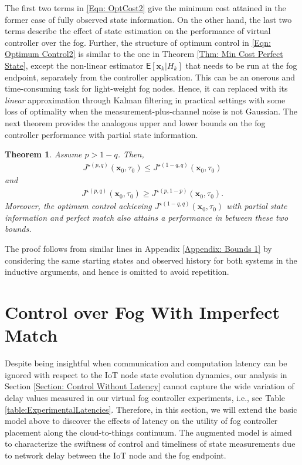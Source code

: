\documentclass[10pt, journal, letterpaper]{IEEEtran}
\newcommand{\paren}[1]{\left(#1\right)}
\newcommand{\1}{\ensuremath{\mathbf{1}}} %
\newcommand{\ES}[1]{\ensuremath{\mathsf{E}\left[#1 \right]}} %
\newcommand{\mincost}[2]{\ensuremath{J^{\star\paren{#1, #2}}}\paren{\vec{x}_0, \tau_0}}
\renewcommand{\vec}[1]{\ensuremath{\boldsymbol{#1}}} %
\newtheorem{theorem}{Theorem}
\begin{document}
The first two terms in \eqref{Eqn: OptCost2} give the minimum cost attained in the former case of fully observed state information. On the other hand, the last two terms describe the effect of state estimation on the performance of virtual controller over the fog. Further, the structure of optimum control in \eqref{Eqn: Optimum Control2} is similar to the one in Theorem \ref{Thm: Min Cost Perfect State}, except the non-linear estimator $\ES{\vec{x}_k \big| H_k}$ that needs to be run at the fog endpoint, separately from the controller application. This can be an onerous and time-consuming task for light-weight fog nodes. Hence, it can replaced with its {\em linear} approximation through Kalman filtering in practical settings with some loss of optimality when the measurement-plus-channel noise is not Gaussian. The next theorem provides the analogous upper and lower bounds on the fog controller performance with partial state information.

\begin{theorem} \label{Thm: Min Cost Bounds2}
Assume $p > 1-q$. Then,
\begin{eqnarray*}
\mincost{p}{q} \leq \mincost{1-q}{q}
\end{eqnarray*}
and
\begin{eqnarray*}
\mincost{p}{q} \geq \mincost{p}{1-p}.
\end{eqnarray*}
Moreover, the optimum control achieving $\mincost{1-q}{q}$ with {\em partial} state information and {\em perfect} match also attains a performance in between these two bounds.
\end{theorem}
\begin{IEEEproof}
The proof follows from similar lines in Appendix \ref{Appendix: Bounds 1} by considering the same starting states and observed history for both systems in the inductive arguments, and hence is omitted to avoid repetition. \end{IEEEproof}



\section{Control over Fog With Imperfect Match} \label{Section: Control With Latency}
Despite being insightful when communication and computation latency can be ignored with respect to the IoT node state evolution dynamics, our analysis in Section \ref{Section: Control Without Latency}  cannot capture the wide variation of delay values measured in our virtual fog controller experiments, i.e., see Table \ref{table:ExperimentalLatencies}. Therefore, in this section, we will extend the basic model above to discover the effects of latency on the utility of fog controller placement along the cloud-to-things continuum. The augmented model is aimed to characterize the swiftness of control and timeliness of state measurements due to network delay between the IoT node and the fog endpoint.
\end{document}
